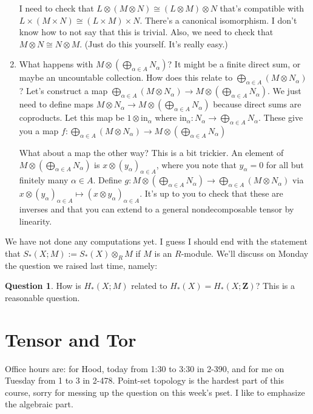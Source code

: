 \documentclass{amsart}
\theoremstyle{theorem}
\theoremstyle{definition}
\newtheorem{question}[theorem]{Question}
\newcommand{\Z}{\mathbf Z}
\begin{document}
\begin{enumerate}
I need to check that $L\otimes(M\otimes N)\cong (L\otimes M)\otimes N$ that's compatible with $L\times (M\times N)\cong (L\times M)\times N$. There's a canonical isomorphism. I don't know how to not say that this is trivial. Also, we need to check that $M\otimes N\cong N\otimes M$. (Just do this yourself. It's really easy.)
\item What happens with $M\otimes\left(\bigoplus_{\alpha\in A}N_\alpha\right)$? It might be a finite direct sum, or maybe an uncountable collection. How does this relate to $\bigoplus_{\alpha\in A}(M\otimes N_\alpha)$? Let's construct a map $\displaystyle\bigoplus_{\alpha\in A}(M\otimes N_\alpha)\to M\otimes\left(\bigoplus_{\alpha\in A}N_\alpha\right)$. We just need to define maps $M\otimes N_\alpha\to M\otimes\left(\bigoplus_{\alpha\in A}N_\alpha\right)$ because direct sums are coproducts. Let this map be $1\otimes\text{in}_\alpha$ where $\mathrm{in}_\alpha:N_\alpha\to \bigoplus_{\alpha\in A}N_\alpha$. These give you a map $f:\bigoplus_{\alpha\in A}(M\otimes N_\alpha)\to M\otimes\left(\bigoplus_{\alpha\in A}N_\alpha\right)$

What about a map the other way? This is a bit trickier. An element of $M\otimes\left(\bigoplus_{\alpha\in A}N_\alpha\right)$ is $x\otimes(y_\alpha)_{\alpha\in A}$, where you note that $y_\alpha=0$ for all but finitely many $\alpha\in A$. Define $g:M\otimes\left(\bigoplus_{\alpha\in A}N_\alpha\right)\to \bigoplus_{\alpha\in A}(M\otimes N_\alpha)$ via $x\otimes(y_\alpha)_{\alpha\in A}\mapsto (x\otimes y_\alpha)_{\alpha\in A}$. It's up to you to check that these are inverses and that you can extend to a general nondecomposable tensor by linearity.
\end{enumerate}
We have not done any computations yet. I guess I should end with the statement that $S_\ast(X;M):=S_\ast(X)\otimes_R M$ if $M$ is an $R$-module. We'll discuss on Monday the question we raised last time, namely:
\begin{question}
How is $ H_\ast(X;M)$ related to $ H_\ast(X)= H_\ast(X;\Z)$? This is a reasonable question.
\end{question}
\section{Tensor and Tor}
Office hours are: for Hood, today from 1:30 to 3:30 in 2-390, and for me on Tuesday from 1 to 3 in 2-478. Point-set topology is the hardest part of this course, sorry for messing up the question on this week's pset. I like to emphasize the algebraic part.
\end{document}
